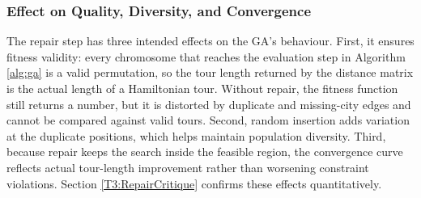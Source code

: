 \subsubsection{Effect on Quality, Diversity, and Convergence}
\label{T2:RepairEffect}
The repair step has three intended effects on the GA's behaviour.
First, it ensures fitness validity: every chromosome that reaches the
evaluation step in Algorithm \ref{alg:ga} is a valid permutation, so
the tour length returned by the distance matrix is the actual length of
a Hamiltonian tour. Without repair, the fitness function still returns a
number, but it is distorted by duplicate and missing-city edges and
cannot be compared against valid tours. Second, random insertion adds
variation at the duplicate positions, which helps maintain population
diversity. Third, because repair keeps the search inside the feasible
region, the convergence curve reflects actual tour-length improvement
rather than worsening constraint violations. Section
\ref{T3:RepairCritique} confirms these effects quantitatively.
